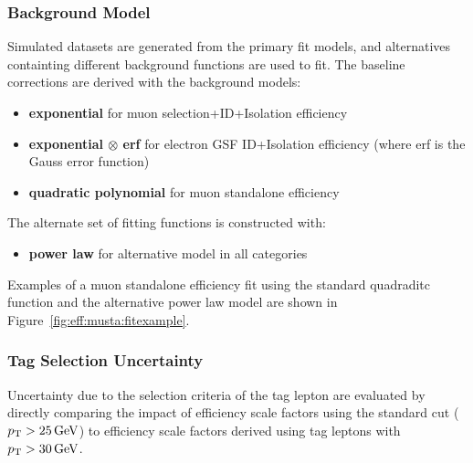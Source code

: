 \subsubsection{Background Model}\label{ch:eff:bkg}
Simulated datasets are generated from the primary fit models, and alternatives containting different background functions are used to fit. The baseline corrections are derived with the background models: 
\begin{itemize}
\item \textbf{exponential} for muon selection+ID+Isolation efficiency
\item \textbf{exponential $\otimes$ erf} for electron GSF ID+Isolation efficiency (where erf is the Gauss error function)
\item \textbf{quadratic polynomial} for muon standalone efficiency
\end{itemize}
The alternate set of fitting functions is constructed with:
\begin{itemize}
\item \textbf{power law} for alternative model in all categories
\end{itemize}
Examples of a muon standalone efficiency fit using the standard quadraditc function and the alternative power law model are shown in Figure~\ref{fig:eff:musta:fitexample}. 


\subsubsection{Tag Selection Uncertainty}
Uncertainty due to the selection criteria of the tag lepton are evaluated by directly comparing the impact of efficiency scale factors using the standard cut ($p_{\mathrm{T}} > 25 \,\text{Ge\hspace{-.08em}V}$) to efficiency scale factors derived using tag leptons with $p_{\mathrm{T}} > 30\,\text{Ge\hspace{-.08em}V}$. 



